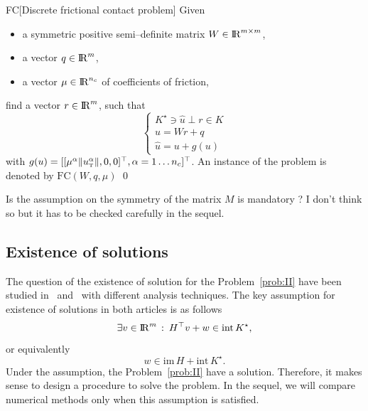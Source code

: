 {\begin{problemenv}{FC}[Discrete frictional contact problem]\label{prob:II}
  Given
  \begin{itemize}
    \item a symmetric positive semi--definite  matrix ${W} \in \mathrm{I\!R}^{m \times m}$,
    \item a vector $ {q} \in \mathrm{I\!R}^m$,
    \item a vector $\mu \in \mathrm{I\!R}^{n_c}$ of coefficients of friction, 
  \end{itemize}
find  a vector $r\in \mathrm{I\!R}^m$, such that
\begin{equation}\label{eq:soccp2}
  \begin{cases}
   K^\star \ni {\hat u} \perp r \in K \\[2mm]
    u =Wr +q \\[2mm]
    \hat u =u + g(u)
  \end{cases}
\end{equation}
with $g(u) = [[\mu^\alpha  \|u^\alpha_{\hbox{\tiny{T}}}\|, 0, 0 ]^\top, \alpha = 1\ldots n_c]^\top$.
An instance of the problem is denoted by $\mathrm{FC}(W,q,\mu)$
\qed
\end{problemenv}
%
\begin{ndrva}
  Is the assumption on the symmetry of the matrix $M$ is mandatory ? I don't think so but it has to be checked carefully in the sequel.
\end{ndrva}
%




\subsection{Existence of solutions}
\label{sec:existence}

The question of the existence of solution for the Problem~\ref{prob:II} have been studied in~\cite{Klarbring.Pang1998} and~\cite{Acary.ea_ZAMM2011} with different analysis techniques.
The key assumption for existence of solutions in both articles is as follows
\begin{equation}\label{ass}
   \exists v\in \RR^m \,:\: H^\top v + w \in \mathrm{int}\, K^\star,
\end{equation}
or equivalently
\begin{equation}\label{asseq}
  w\in\mathrm{im}\, H + \mathrm{int}\, K^\star.
\end{equation}
Under the assumption, the Problem~\ref{prob:II} have a solution.
Therefore, it makes sense to design a procedure to solve the problem. In the sequel, we will compare numerical methods only when this assumption is satisfied.

}

